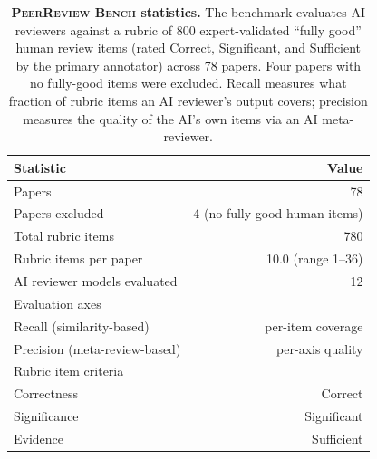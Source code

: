 \begin{table}[t]
\centering
\fontsize{8}{10.5}\selectfont
\setlength{\tabcolsep}{5pt}
\begin{tabular}{lr}
\toprule
\textbf{Statistic} & \textbf{Value} \\
\midrule
Papers & 78 \\
Papers excluded & 4 (no fully-good human items) \\
Total rubric items & 780 \\
Rubric items per paper & 10.0 (range 1--36) \\
\midrule
AI reviewer models evaluated & 12 \\
Evaluation axes & \\
\quad Recall (similarity-based) & per-item coverage \\
\quad Precision (meta-review-based) & per-axis quality \\
\midrule
Rubric item criteria & \\
\quad Correctness & Correct \\
\quad Significance & Significant \\
\quad Evidence & Sufficient \\
\bottomrule
\end{tabular}
\caption{\textbf{\textsc{PeerReview Bench} statistics.}
The benchmark evaluates AI reviewers against a rubric of 800 expert-validated ``fully good'' human review items (rated Correct, Significant, and Sufficient by the primary annotator) across 78 papers.
Four papers with no fully-good items were excluded.
Recall measures what fraction of rubric items an AI reviewer's output covers; precision measures the quality of the AI's own items via an AI meta-reviewer.
}
\label{tab:stats-peerreview-bench}
\end{table}
